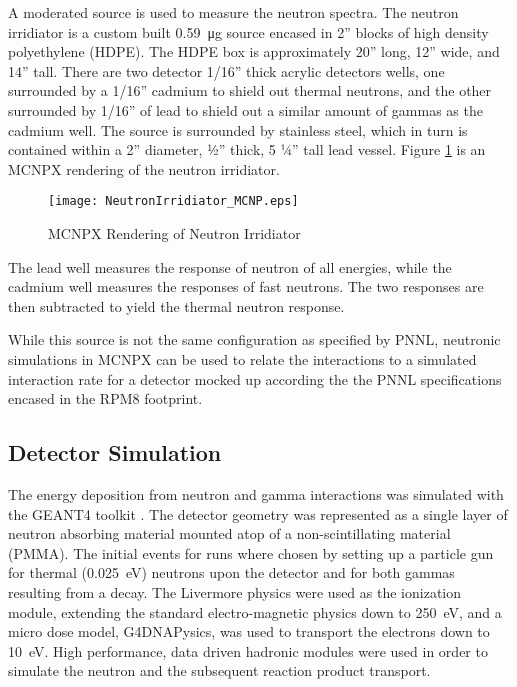 \documentclass[draftcls,onecolumn]{IEEEtran}
\begin{document}
A moderated  source is used to measure the neutron spectra.
The neutron irridiator is a custom built \SI{0.59}{\ug} source encased in 2” blocks of high density polyethylene (HDPE).
The HDPE box is approximately 20” long, 12” wide, and 14” tall.
There are two detector 1/16” thick acrylic detectors wells, one surrounded by a 1/16” cadmium to shield out thermal neutrons, and the other surrounded by 1/16” of lead to shield out a similar amount of gammas as the cadmium well.
The  source is surrounded by stainless steel, which in turn is contained within a 2” diameter, ½” thick, 5 ¼” tall lead vessel. 
Figure \ref{fig:neutronIrridiator} is an MCNPX rendering of the neutron irridiator.
\begin{figure}[ht]
	\centering
	\texttt{[image: NeutronIrridiator\_MCNP.eps]}
	\caption{MCNPX Rendering of Neutron Irridiator}
	\label{fig:neutronIrridiator}
\end{figure}
The lead well measures the response of neutron of all energies, while the cadmium well measures the responses of fast neutrons.
The two responses are then subtracted to yield the thermal neutron response.

While this source is not the same configuration as specified by PNNL, neutronic simulations in MCNPX can be used to relate the interactions to a simulated interaction rate for a detector mocked up according the the PNNL specifications encased in the RPM8 footprint.

\subsection{Detector Simulation}
The energy deposition from neutron and gamma interactions was simulated with the GEANT4 toolkit \cite{agostinelli_geant4simulation_2003}.
The detector geometry was represented as a single layer of neutron absorbing material mounted atop of a non-scintillating material (PMMA).
The initial events for runs where chosen by setting up a particle gun for thermal (\SI{0.025}{\eV}) neutrons upon the detector and for both gammas resulting from a  decay.
The Livermore physics were used as the ionization module, extending the standard electro-magnetic physics down to \SI{250}{\eV}, and a micro dose model, G4DNAPysics, was used to transport the electrons down to \SI{10}{\eV}.
High performance, data driven hadronic modules were used in order to simulate the neutron and the subsequent reaction product transport.
\end{document}
